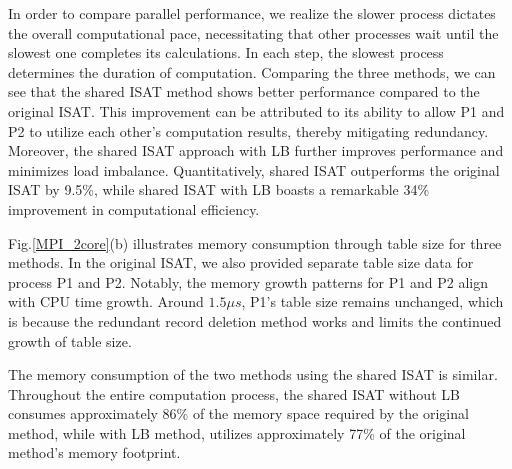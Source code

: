 In order to compare parallel performance, we realize the slower process dictates the overall computational pace, necessitating that other processes wait until the slowest one completes its calculations. In each step, the slowest process determines the duration of computation. Comparing the three methods, we can see that the shared ISAT method shows better performance compared to the original ISAT. This improvement can be attributed to its ability to allow P1 and P2 to utilize each other's computation results, thereby mitigating redundancy. Moreover, the shared ISAT approach with LB further improves performance and minimizes load imbalance. Quantitatively, shared ISAT outperforms the original ISAT by 9.5\%, while shared ISAT with LB boasts a remarkable 34\% improvement in computational efficiency.


Fig.\ref{MPI_2core}(b) illustrates memory consumption through table size for three methods. In the original ISAT, we also provided separate table size data for process P1 and P2. Notably, the memory growth patterns for P1 and P2 align with CPU time growth. Around $1.5 \mu s$, P1's table size remains unchanged, which is because the redundant record deletion method works and limits the continued growth of table size.

The memory consumption of the two methods using the shared ISAT is similar. Throughout the entire computation process, the shared ISAT without LB consumes approximately 86\% of the memory space required by the original method, while with LB method, utilizes approximately 77\% of the original method's memory footprint.



